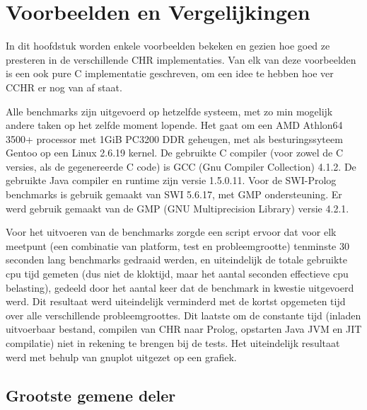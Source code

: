 \chapter{Voorbeelden en Vergelijkingen} \label{chap:bench}

\newcommand{\benchfig}[2]{
\begin{figure}[htbp]
\begin{center}
\includevector{1}{fig/bench-#1}
\caption{\label{fig:bench-#1}#2}
\end{center}
\end{figure}
}

In dit hoofdstuk worden enkele voorbeelden bekeken en gezien hoe goed ze presteren in de verschillende CHR implementaties. Van elk van deze voorbeelden is een ook pure C implementatie geschreven, om een idee te hebben hoe ver CCHR er nog van af staat.

Alle benchmarks zijn uitgevoerd op hetzelfde systeem, met zo min mogelijk andere taken op het zelfde moment lopende. Het gaat om een AMD Athlon64 3500+ processor met 1GiB PC3200 DDR geheugen, met als besturingssyteem Gentoo op een Linux 2.6.19 kernel. De gebruikte C compiler (voor zowel de C versies, als de gegenereerde C code) is GCC (Gnu Compiler Collection) 4.1.2. De gebruikte Java compiler en runtime zijn versie 1.5.0.11. Voor de SWI-Prolog benchmarks is gebruik gemaakt van SWI 5.6.17, met GMP ondersteuning. Er werd gebruik gemaakt van de GMP (GNU Multiprecision Library) versie 4.2.1.

Voor het uitvoeren van de benchmarks zorgde een script ervoor dat voor elk meetpunt (een combinatie van platform, test en probleemgrootte) tenminste 30 seconden lang benchmarks gedraaid werden, en uiteindelijk de totale gebruikte cpu tijd gemeten (dus niet de kloktijd, maar het aantal seconden effectieve cpu belasting), gedeeld door het aantal keer dat de benchmark in kwestie uitgevoerd werd. Dit resultaat werd uiteindelijk verminderd met de kortst opgemeten tijd over alle verschillende probleemgroottes. Dit laatste om de constante tijd (inladen uitvoerbaar bestand, compilen van CHR naar Prolog, opstarten Java JVM en JIT compilatie) niet in rekening te brengen bij de tests. Het uiteindelijk resultaat werd met behulp van gnuplot uitgezet op een grafiek.

\section{Grootste gemene deler} \label{sec:bench-gcd}

